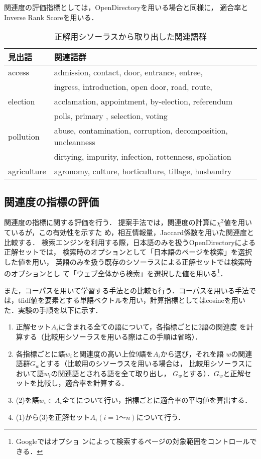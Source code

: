 \documentclass[japanese]{jnlp_1.3a}
\begin{document}
関連度の評価指標としては，OpenDirectoryを用いる場合と同様に，
適合率とInverse Rank Scoreを用いる．



\begin{table}[t]
\caption{正解用シソーラスから取り出した関連語群}
\label{WordNetExample}
\begin{center}
\begin{tabular}{l l}
\hline
見出語 & 関連語群 \\ \hline
access & admission, contact, door, entrance, entree, \\
	& ingress, introduction, open door, road, route,  \\
election & acclamation, appointment, by-election, referendum \\
		 & polls, primary , selection, voting \\
pollution & abuse, contamination, corruption, decomposition, uncleanness\\
	 & dirtying, impurity, infection, rottenness, spoliation\\ 
agriculture & agronomy, culture, horticulture, tillage, husbandry \\ \hline
\end{tabular}
\end{center}
\end{table}

\subsection{関連度の指標の評価}


関連度の指標に関する評価を行う．
提案手法では，関連度の計算に$\chi^2$値を用いているが，この有効性を示すた
め，相互情報量，Jaccard係数を用いた関連度と比較する．
検索エンジンを利用する際，日本語のみを扱うOpenDirectoryによる正解セットでは，
検索時のオプションとして「日本語のページを検索」を選択した値を用い，
英語のみを扱う既存のシソーラスによる正解セットでは検索時のオプションとし
て「ウェブ全体から検索」を選択した値を用いる\footnote{Googleではオプショ
ンによって検索するページの対象範囲をコントロールできる．}．

また，コーパスを用いて学習する手法との比較も行う．コーパスを用いる手法で
は，tfidf値を要素とする単語ベクトルを用い，計算指標としてはcosineを用いた．実験の手順を以下に示す．

\begin{enumerate}
\item 正解セット$A_i$に含まれる全ての語について，各指標ごとに2語の関連度
      を計算する（比較用シソーラスを用いる際はこの手順は省略）．
\item 各指標ごとに語$w_i$と関連度の高い上位9語を$A_i$から選び，それを語
      $w$の関連語群$G_{w}$とする（比較用のシソーラスを用いる場合は，
      比較用シソーラスにおいて語$w_i$の関連語とされる語を全て取り出し，
      $G_{w}$とする）．$G_{w}$と正解セットを比較し，適合率を計算する．
\item (2)を語$w_i \in A_i$全てについて行い，指標ごとに適合率の平均値を算出する．
\item (1)から(3)を正解セット$A_i(i=1〜n)$について行う．
\end{enumerate}
\end{document}

